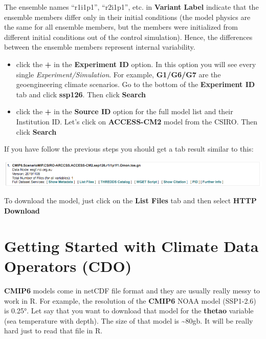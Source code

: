 \documentclass[]{book}
\providecommand{\tightlist}{%
  \setlength{\itemsep}{0pt}\setlength{\parskip}{0pt}}
\begin{document}
The ensemble names ``r1i1p1'', ``r2i1p1'', etc. in \textbf{Variant Label} indicate that the ensemble members differ only in their initial conditions (the model physics are the same for all ensemble members, but the members were initialized from different initial conditions out of the control simulation). Hence, the differences between the ensemble members represent internal variability.

\begin{itemize}
\tightlist
\item
  click the \textbf{+} in the \textbf{Experiment ID} option. In this option you will see every single \emph{Experiment/Simulation}. For example, \textbf{G1/G6/G7} are the geoengineering climate scenarios. Go to the bottom of the \textbf{Experiment ID} tab and click \textbf{ssp126}. Then click \textbf{Search}
\item
  click the \textbf{+} in the \textbf{Source ID} option for the full model list and their Institution ID. Let's click on \textbf{ACCESS-CM2} model from the CSIRO. Then click \textbf{Search}
\end{itemize}

If you have follow the previous steps you should get a tab result similar to this:

\begin{center}\includegraphics[width=1\linewidth]{images/model_example_tab} \end{center}

To download the model, just click on the \textbf{List Files} tab and then select \textbf{HTTP Download}

\hypertarget{getting-started-with-climate-data-operators-cdo}{%
\chapter{Getting Started with Climate Data Operators (CDO)}\label{getting-started-with-climate-data-operators-cdo}}

\textbf{CMIP6} models come in netCDF file format and they are usually really messy to work in R. For example, the resolution of the \textbf{CMIP6} NOAA model (SSP1-2.6) is 0.25°. Let say that you want to download that model for the \textbf{thetao} variable (sea temperature with depth). The size of that model is \textasciitilde{}80gb. It will be really hard just to read that file in R.
\end{document}

